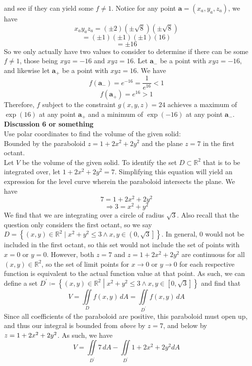 \documentclass[12pt, letterpaper]{report}
\begin{document}
and see if they can yield some \(f\neq 1\). Notice for any point \(\mathbf{a}=(x_a,y_a,z_a) \), we have
\[
     x_a y_az_a=\left( \pm 2 \right) \left( \pm \sqrt{8}  \right) \left( \pm \sqrt{8}  \right)
\] 
\[
    =(\pm 1)(\pm 1)(\pm 1)(16)
\]
\[
    =\pm 16
\]
So we only actually have two values to consider to determine if there can be some \(f\neq 1\), those being \(xyz=-16\) and \(xyz=16\). Let \(\mathbf{a}_- \) be a point with \(xyz=-16\), and likewise let \(\mathbf{a} _+\) be a point with \(xyz=16\). We have 
\[
    f(\mathbf{a} _-)=e^{-16} =\frac{1}{e^{16} }<1
\]
\[
    f(\mathbf{a} _+)=e^{16}>1 
\]
Therefore, \(f\) subject to the constraint \(g(x,y,z)=24\) achieves a maximum of \(\exp (16) \) at any point \(\mathbf{a} _+\) and a minimum of \(\exp (-16) \) at any point \(\mathbf{a} _{-} \).
\newpage
\noindent\textbf{\large Discussion 6 or something}\\
Use polar coordinates to find the volume of the given solid:\\
Bounded by the paraboloid \(z=1+2x^2 + 2y^2\) and the plane \(z=7\) in the first octant.\\
Let \(V\) be the volume of the given solid. To identify the set \(D \subset \mathbb{R} ^2\) that is to be integrated over, let \(1+2x^2 + 2y^2 = 7\). Simplifying this equation will yield an expression for the level curve wherein the paraboloid intersects the plane. We have 
\[
    7=1+2x^2 +2y^2
\]
\[
    \Longrightarrow 3=x^2 +y^2
\]
We find that we are integrating over a circle of radius \(\sqrt{3} \). Also recall that the question only considers the first octant, so we say \(D=\left\{ (x,y)\in\mathbb{R} ^2 \mid x^2 + y^2 \leq  3 \land x,y\in\left(0,\sqrt{3} \right] \right\} \). In general, \(0\) would not be included in the first octant, so this set would not include the set of points with \(x=0\) or \(y=0\). However, both \(z=7\) and \(z=1+2x^2 +2y^2\) are continuous for all \((x,y)\in\mathbb{R} ^2\), so the set of limit points for \(x\to 0\) or \(y\to 0\) for each respective function is equivalent to the actual function value at that point. As such, we can define a set \(D^{\prime}\coloneqq \left\{ (x,y)\in\mathbb{R} ^2 \middle| x^2 + y^2 \leq  3 \land x,y\in\left[0,\sqrt{3} \right] \right\} \) and find that\\
\[
    V=\iint\limits_{D}f(x,y)\,dA = \iint\limits_{D^{\prime} }f(x,y)\,dA
\]
Since all coefficients of the paraboloid are positive, this paraboloid must open up, and thus our integral is bounded from \emph{above} by \(z=7\), and below by \(z=1+2x^2 +\text2y^2 \). As such, we have 
\[
    V=\iint\limits_{D^{\prime} }7\,dA - \iint\limits_{D^{\prime} }1+2x^2 + 2y^2 dA
\]
\end{document}
